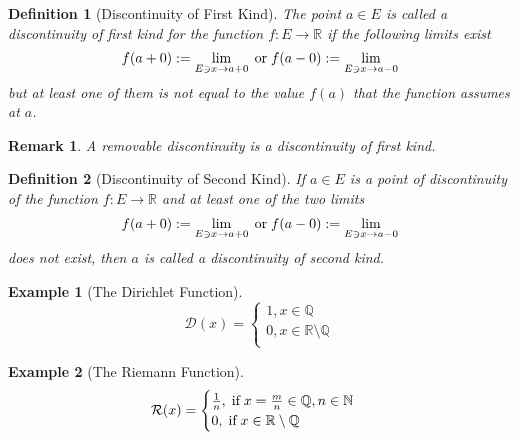 \documentclass[onecolumn]{ctexart}
\newtheorem{definition}{Definition}
\newtheorem{remark}{Remark}
\newtheorem{example}{Example}
\begin{document}
\begin{definition}[Discontinuity of First Kind]
  The point $a \in E$ is called a discontinuity of first kind for the function 
  $f: E \to \mathbb{R}$ if the following limits exist
  \[
    f(a + 0) := \lim_{E \owns x \to a+0} \thickspace \textnormal{or} \thickspace f(a-0) := \lim_{E \owns x \to a-0}
  \]
  but at least one of them is not equal to the value $f(a)$ that the function 
  assumes at $a$.
\end{definition}
\begin{remark}
  A removable discontinuity is a discontinuity of first kind.
\end{remark}

\begin{definition}[Discontinuity of Second Kind]
  If $a \in E$ is a point of discontinuity of the function $f: E \to \mathbb{R}$
  and at least one of the two limits
  \[
    f(a + 0) := \lim_{E \owns x \to a+0} \thickspace \textnormal{or} \thickspace f(a-0) := \lim_{E \owns x \to a-0}
  \]
  does not exist, then $a$ is called a discontinuity of second kind.
\end{definition}

\begin{example}[The Dirichlet Function]
  \[
    \mathcal{D}(x) = 
    \begin{cases}
      1, x \in \mathbb{Q} \\
      0, x \in \mathbb{R} \setminus \mathbb{Q} \\
    \end{cases}
  \]
\end{example}

\begin{example}[The Riemann Function]
  \[
    \mathcal{R}(x) = 
    \begin{cases}
      \frac{1}{n}, \thickspace \textnormal{if} \thickspace x = \frac{m}{n} \in \mathbb{Q}, n \in \mathbb{N} \\
      0, \thickspace \textnormal{if} \thickspace x \in \mathbb{R} \setminus \mathbb{Q} \\
    \end{cases}
  \]
\end{example}
\end{document}
